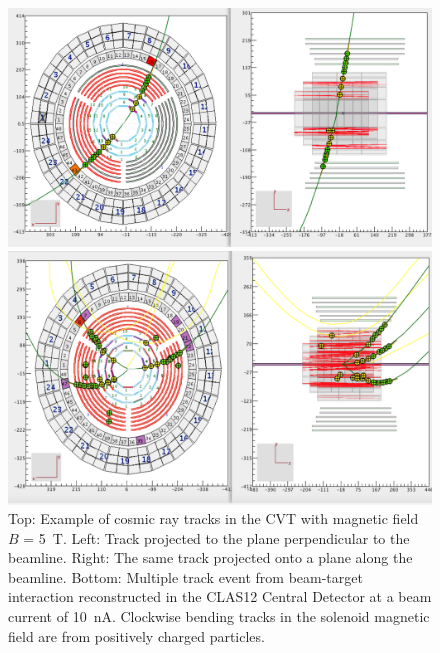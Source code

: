 \documentclass[final,3p,twocolumn]{elsarticle}
\begin{document}
\begin{figure}[th!]
\centerline{\includegraphics[width=1.0\columnwidth]{cvt-cosmic-w-solenoid.png}}
\vspace{-0.5cm}\centerline{\includegraphics[width=1.0\columnwidth]{cvt-3-tracks.png}}
\caption{Top: Example of cosmic ray tracks in the CVT with magnetic field $B$ = 5~T. Left: Track projected to the
  plane perpendicular to the beamline. Right: The same track projected onto a plane along the beamline. Bottom: Multiple
  track event from beam-target interaction reconstructed in the CLAS12 Central Detector at a beam current of 10~nA.
  Clockwise bending tracks in the solenoid magnetic field are from positively charged particles.}
\label{cvt-tracks}
\end{figure}
\end{document}
